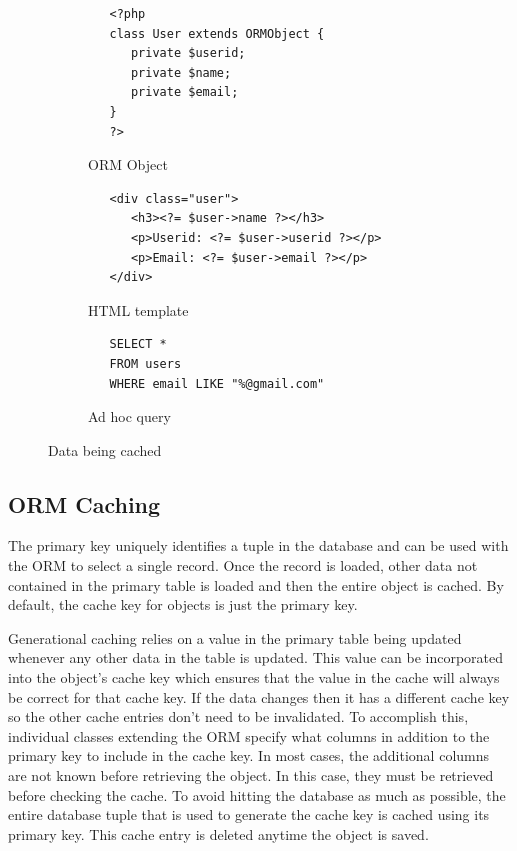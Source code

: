 \documentclass[12pt]{ucthesis}
\begin{document}
\begin{figure}[h]
\begin{subfigure}[b]{1.0\textwidth}
   \begin{ssp}
   \begin{verbatim}
   <?php
   class User extends ORMObject {
      private $userid;
      private $name;
      private $email;
   }
   ?>
   \end{verbatim}
   \end{ssp}
   \caption{ORM Object}
   \label{fig:ormObject}
\end{subfigure}

\begin{subfigure}[b]{1.0\textwidth}
   \begin{ssp}
   \begin{verbatim}
   <div class="user">
      <h3><?= $user->name ?></h3>
      <p>Userid: <?= $user->userid ?></p>
      <p>Email: <?= $user->email ?></p>
   </div>
   \end{verbatim}
   \end{ssp}
   \caption{HTML template}
   \label{fig:htmlTemplate}
\end{subfigure}

\begin{subfigure}[b]{1.0\textwidth}
   \begin{ssp}
   \begin{verbatim}
   SELECT *
   FROM users
   WHERE email LIKE "%@gmail.com"
   \end{verbatim}
   \end{ssp}
   \caption{Ad hoc query}
   \label{fig:adHocQuery}
\end{subfigure}

\caption{Data being cached}
\label{fig:dataBeingCached}
\end{figure}

\subsection{ORM Caching}
The primary key uniquely identifies a tuple in the database and can be used with the ORM to select a single record.
Once the record is loaded, other data not contained in the primary table is loaded and then the entire object is cached.
By default, the cache key for objects is just the primary key.

Generational caching relies on a value in the primary table being updated whenever any other data in the table is updated.
This value can be incorporated into the object's cache key which ensures that the value in the cache will always be correct for that cache key.
If the data changes then it has a different cache key so the other cache entries don't need to be invalidated.
To accomplish this, individual classes extending the ORM specify what columns in addition to the primary key to include in the cache key.
In most cases, the additional columns are not known before retrieving the object.
In this case, they must be retrieved before checking the cache.
To avoid hitting the database as much as possible, the entire database tuple that is used to generate the cache key is cached using its primary key.
This cache entry is deleted anytime the object is saved.
\end{document}
